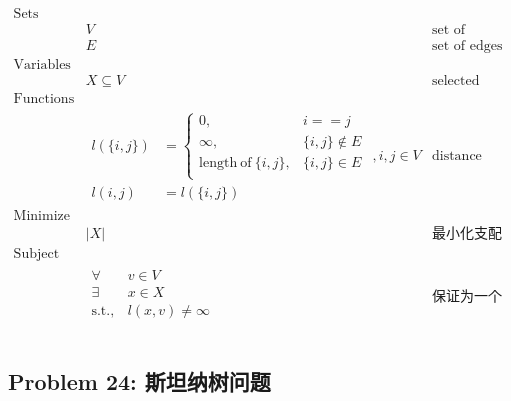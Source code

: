 \documentclass[11pt]{article}
\begin{document}
\begin{eqnarray*}
    \textrm{Sets} \\
        & V & \textrm{set of vertices} \\
        & E & \textrm{set of edges} \\
    \textrm{Variables} \\
        & X \subseteq V & \textrm{selected vertices} \\
    \textrm{Functions} \\
        & \begin{array}{rl}
            l(\{i, j\}) &= \left\{
                \begin{array}{ll}
                    0,                              & i == j \\
                    \infty,                         & \{i, j\} \notin E \\
                    \mathrm{length\ of\ }\{i, j\},  & \{i, j\} \in E \\
                \end{array}
            \right. \\
            l(i, j) &= l(\{i, j\})
        \end{array}, i, j \in V & \textrm{distance between vertices} \\
    \textrm{Minimize} \\
        & \displaystyle |X| & \textrm{最小化支配集大小} \\
    \textrm{Subject to} \\
        & \begin{array}{rl}
            \forall & v \in V \\
            \exists & x \in X \\
            \mathrm{s.t.,} & l(x, v) \neq \infty \\
        \end{array} & \textrm{保证为一个支配集} \\ 
\end{eqnarray*}


\newpage
\subsection*{Problem 24: 斯坦纳树问题}
\end{document}
